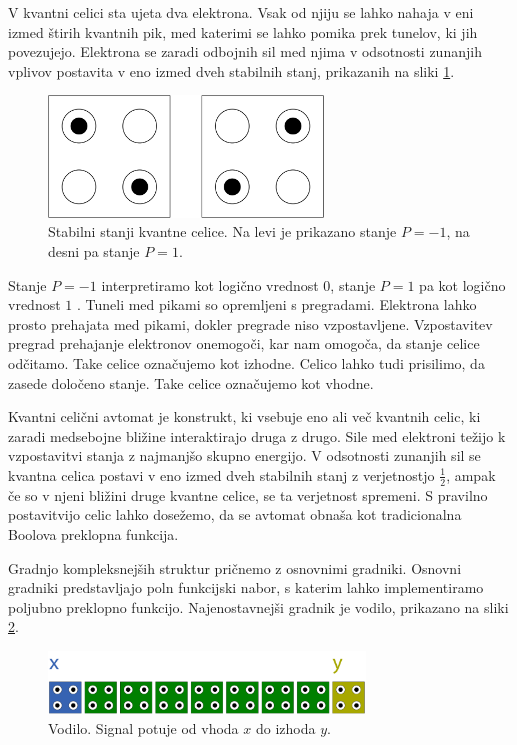 \documentclass[a4paper, 11pt]{article}
\begin{document}
V kvantni celici sta ujeta dva elektrona.
Vsak od njiju se lahko nahaja v eni izmed štirih kvantnih pik, med katerimi se lahko pomika prek tunelov, ki jih povezujejo.
Elektrona se zaradi odbojnih sil med njima v odsotnosti zunanjih vplivov postavita v eno izmed dveh stabilnih stanj, prikazanih na sliki \ref{img-pregled-2states}.

\begin{figure}[h]
	\centering
	\includegraphics[width=0.65\textwidth]{../img/pregled/2states.pdf}
	\caption{Stabilni stanji kvantne celice. Na levi je prikazano stanje $P = -1$, na desni pa stanje $P = 1$.}
	\label{img-pregled-2states}
\end{figure}

Stanje $P = -1$ interpretiramo kot logično vrednost $0$, stanje $P = 1$ pa kot logično vrednost $1$ \cite{lent_1993}.
Tuneli med pikami so opremljeni s pregradami.
Elektrona lahko prosto prehajata med pikami, dokler pregrade niso vzpostavljene.
Vzpostavitev pregrad prehajanje elektronov onemogoči, kar nam omogoča, da stanje celice odčitamo.
Take celice označujemo kot izhodne.
Celico lahko tudi prisilimo, da zasede določeno stanje.
Take celice označujemo kot vhodne.

Kvantni celični avtomat je konstrukt, ki vsebuje eno ali več kvantnih celic, ki zaradi medsebojne bližine interaktirajo druga z drugo.
Sile med elektroni težijo k vzpostavitvi stanja z najmanjšo skupno energijo.
V odsotnosti zunanjih sil se kvantna celica postavi v eno izmed dveh stabilnih stanj z verjetnostjo $\frac{1}{2}$, ampak če so v njeni bližini druge kvantne celice, se ta verjetnost spremeni.
S pravilno postavitvijo celic lahko dosežemo, da se avtomat obnaša kot tradicionalna Boolova preklopna funkcija.

Gradnjo kompleksnejših struktur pričnemo z osnovnimi gradniki.
Osnovni gradniki predstavljajo poln funkcijski nabor, s katerim lahko implementiramo poljubno preklopno funkcijo.
Najenostavnejši gradnik je vodilo, prikazano na sliki \ref{img-pregled-bus}.

\begin{figure}[h]
	\centering
	\includegraphics[width=0.75\textwidth]{../img/pregled/bus.pdf}
	\caption{Vodilo. Signal potuje od vhoda $x$ do izhoda $y$.}
	\label{img-pregled-bus}
\end{figure}
\end{document}
